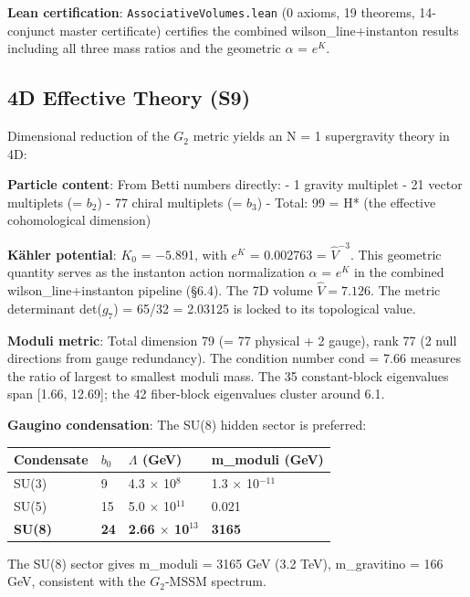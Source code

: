 \documentclass[11pt,a4paper]{article}
\begin{document}
\textbf{Lean certification}: \texttt{AssociativeVolumes.lean} (0 axioms,
19 theorems, 14-conjunct master certificate) certifies the combined
wilson\_line+instanton results including all three mass ratios and the
geometric \(\alpha\) = \(e^K\).

\subsection{4D Effective Theory (S9)}

Dimensional reduction of the \(G_{2}\) metric yields an N = 1
supergravity theory in 4D:

\textbf{Particle content}: From Betti numbers directly: - 1 gravity
multiplet - 21 vector multiplets (= \(b_{2}\)) - 77 chiral multiplets (=
\(b_{3}\)) - Total: 99 = H* (the effective cohomological dimension)

\textbf{Kähler potential}: \(K_{0}\) = \(- 5\).891, with \(e^K\) =
0.002763 = $\hat{V}^{-3}$. This geometric quantity serves as the
instanton action normalization \(\alpha\) = \(e^K\) in the combined
wilson\_line+instanton pipeline (§6.4). The 7D volume $\hat{V} = 7.126$. The
metric determinant det(\(g_{7}\)) = 65/32 = 2.03125 is locked to its
topological value.

\textbf{Moduli metric}: Total dimension 79 (= 77 physical + 2 gauge),
rank 77 (2 null directions from gauge redundancy). The condition number
cond = 7.66 measures the ratio of largest to smallest moduli mass. The
35 constant-block eigenvalues span {[}1.66, 12.69{]}; the 42 fiber-block
eigenvalues cluster around 6.1.

\textbf{Gaugino condensation}: The SU(8) hidden sector is preferred:

\begin{longtable}[]{@{}llll@{}}
\toprule\noalign{}
Condensate & \(b_{0}\) & \(\Lambda\) (GeV) & m\_moduli (GeV) \\
\midrule\noalign{}
\endhead
\bottomrule\noalign{}
\endlastfoot
SU(3) & 9 & 4.3 \(\times\) 10\(^{8}\) & 1.3 \(\times\) 10\(^{-11}\) \\
SU(5) & 15 & 5.0 \(\times\) 10\(^{11}\) & 0.021 \\
\textbf{SU(8)} & \textbf{24} & \textbf{2.66 \(\times\) 10\(^{13}\)} &
\textbf{3165} \\
\end{longtable}


The SU(8) sector gives m\_moduli = 3165 GeV (3.2 TeV), m\_gravitino =
166 GeV, consistent with the \(G_{2}\)-MSSM spectrum.
\end{document}

